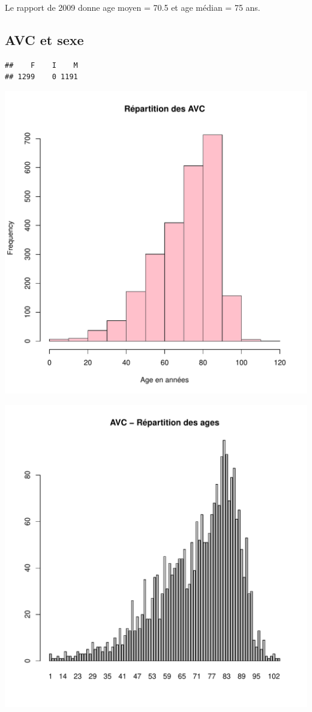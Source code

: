 \documentclass[12pt,english,french,twoside]{report}\usepackage[]{graphicx}\usepackage[]{color}
\makeatletter
\def\maxwidth{ %
  \ifdim\Gin@nat@width>\linewidth
    \linewidth
  \else
    \Gin@nat@width
  \fi
}
\newenvironment{kframe}{%
 \def\at@end@of@kframe{}%
 \ifinner\ifhmode%
  \def\at@end@of@kframe{\end{minipage}}%
  \begin{minipage}{\columnwidth}%
 \fi\fi%
 \def\FrameCommand##1{\hskip\@totalleftmargin \hskip-\fboxsep
 \colorbox{shadecolor}{##1}\hskip-\fboxsep
     \hskip-\linewidth \hskip-\@totalleftmargin \hskip\columnwidth}%
 \MakeFramed {\advance\hsize-\width
   \@totalleftmargin\z@ \linewidth\hsize
   \@setminipage}}%
 {\par\unskip\endMakeFramed%
 \at@end@of@kframe}
\newenvironment{knitrout}{}{} %
\makeatother
\begin{document}
Le rapport de 2009 donne age moyen = 70.5 et age médian = 75 ans.

\subsection*{AVC et sexe}
\begin{knitrout}
\color{fgcolor}\begin{kframe}
\begin{verbatim}
##    F    I    M 
## 1299    0 1191
\end{verbatim}
\end{kframe}
\includegraphics[width=\maxwidth]{figure/avc_sexe1} 

\includegraphics[width=\maxwidth]{figure/avc_sexe2} 


\end{knitrout}
\end{document}
